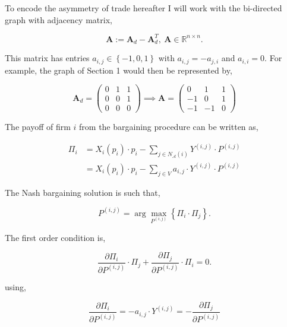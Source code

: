 \documentclass[american]{scrartcl}
\newcommand{\R}{\mathbb{R}}
\newcommand{\matr}[1]{\bm{#1}}
\newcommand{\set}[1]{\left\{#1\right\}}
\begin{document}
To encode the asymmetry of trade hereafter I will work with the bi-directed graph with adjacency matrix,

\begin{equation}
	\matr{A} := \matr{A}_{d} - \matr{A}_{d}^T,  \ \matr{A} \in\R^{n\times n}.
\end{equation}

This matrix has entries $a_{i, j} \in \set{-1, 0, 1}$ with $a_{i, j} = - a_{j, i}$ and $a_{i, i} = 0$. For example, the graph of Section 1 would then be represented by,

\begin{equation}
	\matr{A}_d= \begin{pmatrix}
		0 & 1 & 1 \\
		0 & 0 & 1 \\
		0 & 0 & 0
	\end{pmatrix} \implies
	\matr{A} = \begin{pmatrix}
		0  & 1  & 1 \\
		-1 & 0  & 1 \\
		-1 & -1 & 0
	\end{pmatrix}
\end{equation}

The payoff of firm $i$ from the bargaining procedure can be written as,

\begin{equation}
	\begin{split}
		\Pi_i &= X_i(p_i)\cdot p_i - \sum_{j \in N_{\mathcal{A}}(i)} Y^{(i, j)} \cdot P^{(i, j)} \\
		&= X_i(p_i)\cdot p_i - \sum_{j \in V} a_{i, j} \cdot Y^{(i, j)} \cdot P^{(i, j)}
	\end{split}
\end{equation}

The Nash bargaining solution is such that,

\begin{equation}
	P^{(i, j)} = \arg \max_{P^{(i, j)}} \left\{\Pi_i \cdot \Pi_j \right\}.
\end{equation}

The first order condition is,

\begin{equation}
	\frac{\partial\Pi_i}{\partial P^{(i, j)}} \cdot \Pi_j + \frac{\partial\Pi_j}{\partial P^{(i, j)}} \cdot \Pi_i = 0.
\end{equation}

using,

\begin{equation}
	\frac{\partial\Pi_i}{\partial P^{(i, j)}} = - a_{i, j} \cdot Y^{(i, j)} = -\frac{\partial \Pi_j}{\partial P^{(i, j)}}
\end{equation}
\end{document}
